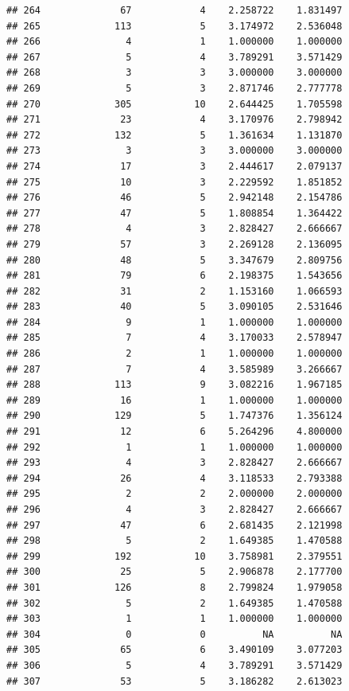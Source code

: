 \documentclass[
]{article}
\begin{document}
\begin{verbatim}
## 264              67            4    2.258722    1.831497
## 265             113            5    3.174972    2.536048
## 266               4            1    1.000000    1.000000
## 267               5            4    3.789291    3.571429
## 268               3            3    3.000000    3.000000
## 269               5            3    2.871746    2.777778
## 270             305           10    2.644425    1.705598
## 271              23            4    3.170976    2.798942
## 272             132            5    1.361634    1.131870
## 273               3            3    3.000000    3.000000
## 274              17            3    2.444617    2.079137
## 275              10            3    2.229592    1.851852
## 276              46            5    2.942148    2.154786
## 277              47            5    1.808854    1.364422
## 278               4            3    2.828427    2.666667
## 279              57            3    2.269128    2.136095
## 280              48            5    3.347679    2.809756
## 281              79            6    2.198375    1.543656
## 282              31            2    1.153160    1.066593
## 283              40            5    3.090105    2.531646
## 284               9            1    1.000000    1.000000
## 285               7            4    3.170033    2.578947
## 286               2            1    1.000000    1.000000
## 287               7            4    3.585989    3.266667
## 288             113            9    3.082216    1.967185
## 289              16            1    1.000000    1.000000
## 290             129            5    1.747376    1.356124
## 291              12            6    5.264296    4.800000
## 292               1            1    1.000000    1.000000
## 293               4            3    2.828427    2.666667
## 294              26            4    3.118533    2.793388
## 295               2            2    2.000000    2.000000
## 296               4            3    2.828427    2.666667
## 297              47            6    2.681435    2.121998
## 298               5            2    1.649385    1.470588
## 299             192           10    3.758981    2.379551
## 300              25            5    2.906878    2.177700
## 301             126            8    2.799824    1.979058
## 302               5            2    1.649385    1.470588
## 303               1            1    1.000000    1.000000
## 304               0            0          NA          NA
## 305              65            6    3.490109    3.077203
## 306               5            4    3.789291    3.571429
## 307              53            5    3.186282    2.613023

\end{verbatim}
\end{document}
